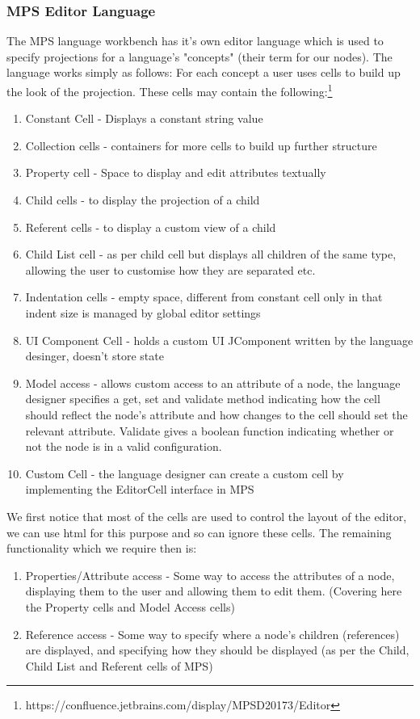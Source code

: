 \documentclass{report}
\begin{document}
\subsubsection{MPS Editor Language}
The MPS language workbench has it's own editor language which is used to specify projections for a language's "concepts" (their term for our nodes). The language works simply as follows: For each concept a user uses cells to build up the look of the projection. These cells may contain the following:\footnote{https://confluence.jetbrains.com/display/MPSD20173/Editor}
\begin{enumerate}
\item Constant Cell - Displays a constant string value
\item Collection cells - containers for more cells to build up further structure
\item Property cell - Space to display and edit attributes textually
\item Child cells - to display the projection of a child
\item Referent cells - to display a custom view of a child
\item Child List cell - as per child cell but displays all children of the same type, allowing the user to customise how they are separated etc.
\item Indentation cells - empty space, different from constant cell only in that indent size is managed by global editor settings
\item UI Component Cell - holds a custom UI JComponent written by the language desinger, doesn't store state
\item Model access - allows custom access to an attribute of a node, the language designer specifies a get, set and validate method indicating how the cell should reflect the node's attribute and how changes to the cell should set the relevant attribute. Validate gives a boolean function indicating whether or not the node is in a valid configuration.
\item Custom Cell - the language designer can create a custom cell by implementing the EditorCell interface in MPS
\end{enumerate}
%
We first notice that most of the cells are used to control the layout of the editor, we can use html for this purpose and so can ignore these cells. The remaining functionality which we require then is:
\begin{enumerate}
\item Properties/Attribute access - Some way to access the attributes of a node, displaying them to the user and allowing them to edit them.  (Covering here the Property cells and Model Access cells)
\item Reference access - Some way to specify where a node's children (references) are displayed, and specifying how they should be displayed (as per the Child, Child List and Referent cells of MPS)
\end{enumerate}
\end{document}
